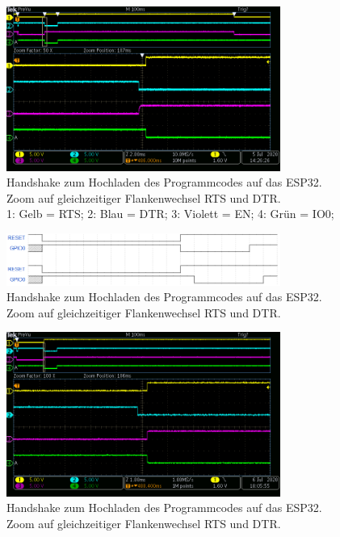\begin{figure}[H]
\center
\includegraphics[width = 0.8\textwidth]{graphics/ESP32_RTS_DTR_EN_IO0_2}
\caption{Handshake zum Hochladen des Programmcodes auf das ESP32. Zoom auf gleichzeitiger Flankenwechsel RTS und DTR.\\\hspace{\textwidth}1: Gelb = RTS; 2: Blau = DTR; 3: Violett = EN; 4: Grün = IO0;}
\label{fig:ESP32_RTS_DTR_EN_IO0_2}
\end{figure}

\begin{figure}[H]
\center
\includegraphics[width = 0.8\textwidth]{graphics/ESP32_Handshake_Forum}
\caption{Handshake zum Hochladen des Programmcodes auf das ESP32. Zoom auf gleichzeitiger Flankenwechsel RTS und DTR.}
\label{fig:ESP32_Handshake_Forum}
\end{figure}

\begin{figure}[H]
\center
\includegraphics[width = 0.8\textwidth]{graphics/ESP32_RTS_DTR_EN_IO0_mit_Bruecke_1}
\caption{Handshake zum Hochladen des Programmcodes auf das ESP32. Zoom auf gleichzeitiger Flankenwechsel RTS und DTR.}
\label{fig:ESP32_RTS_DTR_EN_IO0_mit_Bruecke_1}
\end{figure}

